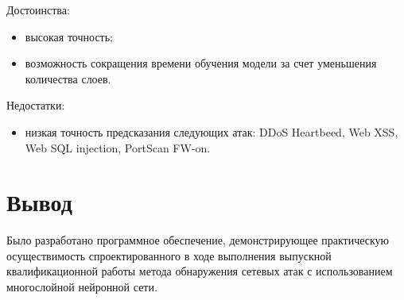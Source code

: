 Достоинства:
\begin{itemize}
    \item высокая точность;
    \item возможность сокращения времени обучения модели за счет уменьшения количества слоев.
\end{itemize}

Недостатки:
\begin{itemize}
    \item низкая точность предсказания следующих атак: DDoS Heartbeed, Web XSS, Web SQL injection, PortScan FW-on.
\end{itemize}

\section*{Вывод}
Было разработано программное обеспечение, демонстрирующее практическую осуществимость спроектированного в
ходе выполнения выпускной квалификационной работы метода обнаружения сетевых атак с использованием многослойной нейронной сети.
















